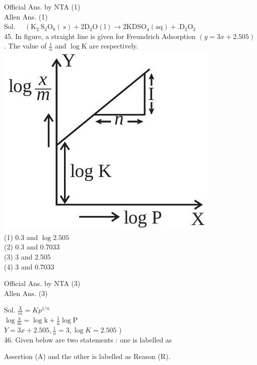 \documentclass[10pt]{article}
\begin{document}
Official Ans. by NTA (1)\\
Allen Ans. (1)\\
Sol. \(\quad\left(\mathrm{K}_{2} \mathrm{~S}_{2} \mathrm{O}_{8}(\mathrm{~s})+2 \mathrm{D}_{2} \mathrm{O}(\mathrm{l}) \rightarrow 2 \mathrm{KDSO}_{4}(\mathrm{aq})+.\mathrm{D}_{2} \mathrm{O}_{2}\right.\)\\
45. In figure, a straight line is given for Freundrich Adsorption \((y=3 x+2.505)\). The value of \(\frac{1}{n}\) and \(\log \mathrm{K}\) are respectively.\\
\includegraphics[max width=\textwidth, center]{2025_10_02_a54bf82dc4585184bb5fg-3(2)}\\
(1) 0.3 and \(\log 2.505\)\\
(2) 0.3 and 0.7033\\
(3) 3 and 2.505\\
(4) 3 and 0.7033

Official Ans. by NTA (3)\\
Allen Ans. (3)

Sol. \(\frac{X}{m}=K p^{1 / n}\)\\
\(\log \frac{\mathrm{x}}{\mathrm{m}}=\log \mathrm{k}+\frac{1}{\mathrm{n}} \log \mathrm{P}\)\\
\(Y=3 x+2.505, \frac{1}{n}=3, \log K=2.505\) )\\
46. Given below are two statements : one is labelled as

Assertion (A) and the other is labelled as Reason (R).
\end{document}
